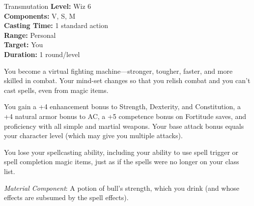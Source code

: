 {Transmutation}
{
	\textbf{Level:}
	Wiz 6\\
	\textbf{Components:}
	V, S, M\\
	\textbf{Casting Time:}
	1 standard action\\
	\textbf{Range:}
	Personal\\
	\textbf{Target:}
	You\\
	\textbf{Duration:}
	1 round/level\\
}
{
	You become a virtual fighting machine---stronger, tougher, faster, and more skilled in combat. Your mind-set changes so that you relish combat and you can't cast spells, even from magic items.

	You gain a +4 enhancement bonus to Strength, Dexterity, and Constitution, a +4 natural armor bonus to AC, a +5 competence bonus on Fortitude saves, and proficiency with all simple and martial weapons. Your base attack bonus equals your character level (which may give you multiple attacks).

	You lose your spellcasting ability, including your ability to use spell trigger or spell completion magic items, just as if the spells were no longer on your class list.

	\textit{Material Component}:
	A potion of bull's strength, which you drink (and whose effects are subsumed by the spell effects).

}
